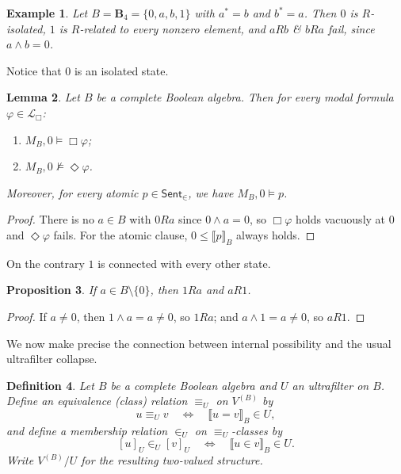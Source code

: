 \documentclass[10pt,a4paper]{amsart}
\newtheorem{definition}{Definition}[section]
\newtheorem{example}[definition]{Example}
\newtheorem{lemma}[definition]{Lemma}
\newtheorem{proposition}[definition]{Proposition}
\newcommand{\Sent}{\mathsf{Sent}}
\newcommand{\Lbox}{\mathcal L_{\Box}} %
\newcommand{\val}[1]{\llbracket #1\rrbracket_B}
\newcommand{\Bfour}{\mathbf{B}_4}
\begin{document}
\begin{example}
Let $B=\Bfour=\{0,a,b,1\}$ with $a^\ast=b$ and $b^\ast=a$.
Then $0$ is $R$-isolated, $1$ is $R$-related to every nonzero element, and $aRb$ \& $bRa$ fail, since $a\wedge b=0$.
\end{example}

Notice that $0$ is an isolated state.

\begin{lemma}\label{lem:state0}
Let $B$ be a complete Boolean algebra. Then for every modal formula $\varphi\in\Lbox$:
\begin{enumerate}[label=(\roman*)]
\item $M_B,0\models \Box\varphi$;
\item $M_B,0\not\models \Diamond\varphi$.
\end{enumerate}
Moreover, for every atomic $p\in\Sent_{\in}$, we have $M_B,0\models p$.
\end{lemma}

\begin{proof}
There is no $a\in B$ with $0Ra$ since $0\wedge a=0$, so $\Box\varphi$ holds vacuously at $0$ and $\Diamond\varphi$
fails. For the atomic clause, $0\le \val{p}$ always holds.
\end{proof}

On the contrary $1$ is connected with every other state.

\begin{proposition}\label{prop:1-related}
If $a\in B\setminus\{0\}$, then $1Ra$ and $aR1$.
\end{proposition}

\begin{proof}
If $a\neq 0$, then $1\wedge a=a\neq 0$, so $1Ra$; and $a\wedge 1=a\neq 0$, so $aR1$.
\end{proof}

We now make precise the connection between internal possibility and the usual ultrafilter collapse.

\begin{definition}\label{def:ultrafilter-quotient}
Let $B$ be a complete Boolean algebra and $U$ an ultrafilter on $B$.
Define an equivalence (class) relation $\equiv_U$ on $V^{(B)}$ by
\[
u\equiv_U v \quad\Longleftrightarrow\quad \val{u=v}\in U,
\]
and define a membership relation $\in_U$ on $\equiv_U$-classes by
\[
[u]_U\in_U [v]_U \quad\Longleftrightarrow\quad \val{u\in v}\in U.
\]
Write $V^{(B)}/U$ for the resulting two-valued structure.
\end{definition}
\end{document}
